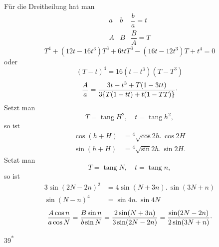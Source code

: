 \begingroup
\makeatletter\tagsleft@true\let\veqno\@@leqno\makeatother
\newcommand{\IndexSurd}[1]{{}^{#1}\!\surd}
\noindent [S. 51]
\par\indent Für die Dreitheilung hat man
\[
\begin{array}{ccc}
a&b&\dfrac ba=t\\[7pt]
A&B&\dfrac BA=T
\end{array}
\]
\begin{equation}
T^4+(12t-16t^3)T^3+6ttT^3-(16t-12t^3)T+t^4=0\tag*{1)}
\end{equation}
\noindent oder
\[(T-t)^4=16(t-t^3)(T-T^3)\]
\[
\frac Aa=\frac{3t-t^3+T(1-3tt)}{3\{T(1-tt)+t(1-TT)\}}\mathpunct{\raisebox{.5ex}{.}}
\]
\noindent Setzt man
\[T=\operatorname{tang}H^2,\quad t=\operatorname{tang}h^2,\]
\noindent so ist
\[\begin{aligned}
\cos(h+H)&=\IndexSurd4\cos2h.\,\cos2H\\
\sin(h+H)&=\IndexSurd4\sin2h.\,\sin2H.
\end{aligned}\]
\noindent Setzt man
\[T=\operatorname{tang}N,\quad t=\operatorname{tang}n,\]
\noindent so ist
\[\begin{aligned}
3\sin(2N-2n)^2&=4\sin(N+3n).\,\sin(3N+n)\\
\sin(N-n)^4&=\sin4n.\,\sin4N
\end{aligned}\]
\[
\frac{A\cos n}{a\cos N}=\frac{B\sin n}{b\sin N}=\frac{2\sin(N+3n)}{3\sin(2N-2n)}=\frac{\sin(2N-2n)}{2\sin(3N+n)}\mathpunct{\raisebox{.5ex}{.}}
\]
\ClosingRule
\par\medskip\noindent\hfill39\textsuperscript{*}
\clearpage
\endgroup
